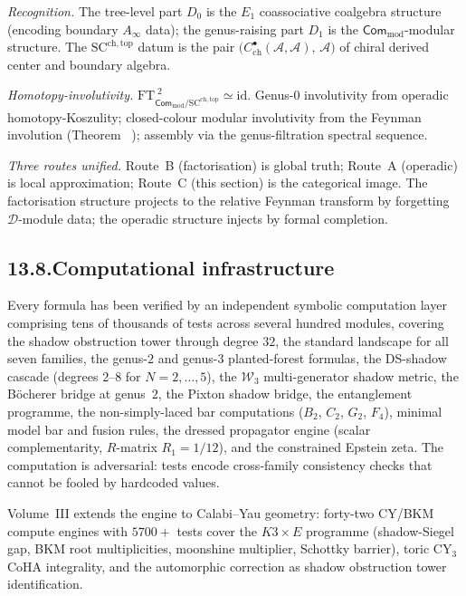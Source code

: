 \documentclass[11pt,reqno]{amsart}
\makeatletter
\theoremstyle{definition}
\theoremstyle{remark}
\providecommand{\cA}{\mathcal{A}}
\providecommand{\cD}{\mathcal{D}}
\providecommand{\cW}{\mathcal{W}}
\providecommand{\SCchtop}{\mathrm{SC}^{\mathrm{ch,top}}}
\providecommand{\id}{\mathrm{id}}
\numberwithin{equation}{section}
\let\svy@oldref\ref
\renewcommand{\ref}[1]{%
 \@ifundefined{r@#1}{\textit{full monograph}}{\svy@oldref{#1}}%
}
\makeatother
\begin{document}
\emph{Recognition.} The tree-level part $D_0$ is the
$E_1$ coassociative coalgebra structure (encoding boundary
$A_\infty$ data); the genus-raising part $D_1$
is the $\mathsf{Com}_{\mathrm{mod}}$-modular structure.
The $\SCchtop$ datum is the pair
$\bigl(C^\bullet_{\mathrm{ch}}(\cA,\cA),\,\cA\bigr)$
of chiral derived center and boundary algebra.

\emph{Homotopy-involutivity.}
$\mathrm{FT}_{\mathsf{Com}_{\mathrm{mod}}/\SCchtop}^{\;2} \simeq \id$.
Genus-$0$ involutivity from operadic homotopy-Koszulity;
closed-colour modular involutivity from the Feynman involution
(Theorem~\ref{thm:feynman-involution}); assembly via the
genus-filtration spectral sequence.

\emph{Three routes unified.} Route~B (factorisation) is global
truth; Route~A (operadic) is local approximation; Route~C
(this section) is the categorical image. The factorisation
structure projects to the relative Feynman transform by
forgetting $\cD$-module data; the operadic structure injects
by formal completion.

\subsection*{13.8.\enspace Computational infrastructure}

Every formula has been verified by an independent symbolic
computation layer comprising tens of thousands of tests across
several hundred modules, covering the shadow obstruction tower
through degree $32$, the standard landscape for all seven
families, the genus-$2$ and genus-$3$ planted-forest formulas,
the DS-shadow cascade (degrees $2$--$8$ for $N = 2, \ldots, 5$),
the $\cW_3$ multi-generator shadow metric, the B\"ocherer bridge
at genus~$2$, the Pixton shadow bridge, the entanglement
programme, the non-simply-laced bar computations ($B_2$, $C_2$,
$G_2$, $F_4$), minimal model bar and fusion rules, the dressed
propagator engine (scalar complementarity, $R$-matrix
$R_1 = 1/12$), and the constrained Epstein zeta. The
computation is adversarial: tests encode cross-family
consistency checks that cannot be fooled by hardcoded values.

Volume~III extends the engine to Calabi--Yau geometry: forty-two
CY/BKM compute engines with $5700+$ tests cover the
$K3 \times E$ programme (shadow-Siegel gap, BKM root
multiplicities, moonshine multiplier, Schottky barrier), toric
CY$_3$ CoHA integrality, and the automorphic correction as
shadow obstruction tower identification.
\end{document}
